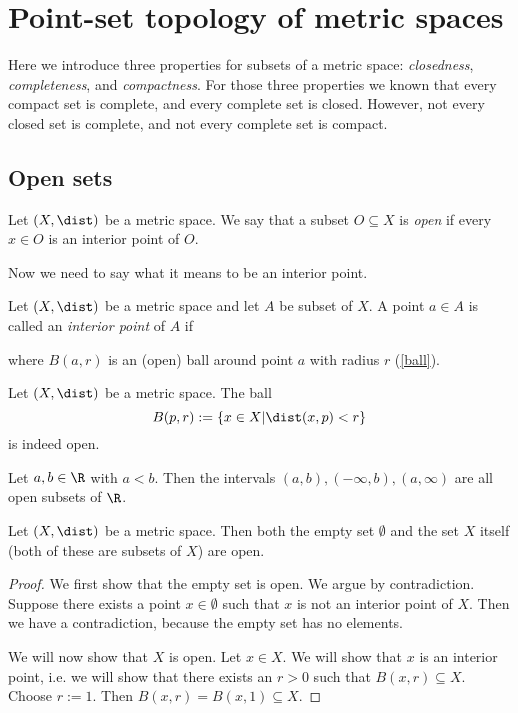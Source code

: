 \section{Point-set topology of metric spaces}
Here we introduce three properties for subsets of a metric space: \emph{closedness}, \emph{completeness}, and \emph{compactness}.
For those three properties we known that every compact set is complete, and every complete set is closed. However, not every closed set is complete,
and not every complete set is compact.

\subsection{Open sets}
\begin{definition}
    Let $(X, \dist)$ be a metric space. We say that a subset $O \subseteq X$ is \emph{open} if every $x \in O$ is an interior point of $O$.
\end{definition}

Now we need to say what it means to be an interior point.
\begin{definition}
    Let $(X, \dist)$ be a metric space and let $A$ be subset of $X$. A point $a \in A$ is called an \emph{interior point} of $A$ if
    \begin{myCenter}
    \end{myCenter}
    where $B(a,r)$ is an (open) ball around point $a$ with radius $r$ (\cref{ball}).
\end{definition}

\begin{proposition}
    Let $(X, \dist)$ be a metric space. The ball
    $$B(p,r) := \{x \in X | \dist(x,p) < r \}$$
    is indeed open.
\end{proposition}

\begin{proposition}
    Let $a,b \in \R$ with $a<b$. Then the intervals $(a,b), (-\infty,b), (a,\infty)$ are all open subsets of $\R$.
\end{proposition}

\begin{proposition}
    Let $(X, \dist)$ be a metric space. Then both the empty set $\emptyset$ and the set $X$ itself (both of these are subsets of $X$) are open.
\end{proposition}
\begin{proof}
    We first show that the empty set is open. We argue by contradiction. Suppose there exists a point $x \in \emptyset$ such that
    $x$ is not an interior point of $X$. Then we have a contradiction, because the empty set has no elements.

    We will now show that $X$ is open. Let $x \in X$. We will show that $x$ is an interior point, i.e. we will show that there exists an $r > 0$
    such that $B(x,r) \subseteq X$.\\
    Choose $r:=1$. Then $B(x,r) = B(x,1) \subseteq X$.
\end{proof}

